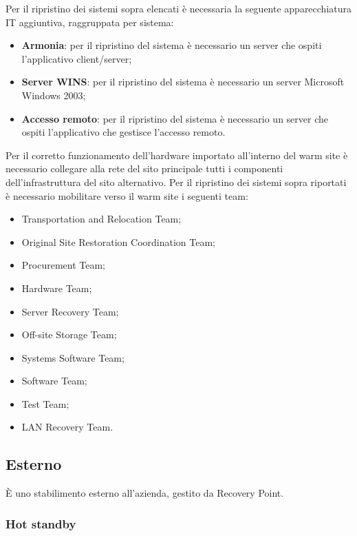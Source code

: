 \documentclass[12pt, a4paper, titlepage]{report}
\newcommand{\hotVendor}{Recovery Point} %
\begin{document}
	Per il ripristino dei sistemi sopra elencati è necessaria la seguente apparecchiatura IT aggiuntiva, raggruppata per sistema:
	\begin{itemize}
		\item \textbf{Armonia}: per il ripristino del sistema è necessario un server che ospiti l'applicativo client/server;
		\item \textbf{Server WINS}: per il ripristino del sistema è necessario un server Microsoft Windows 2003;
		\item \textbf{Accesso remoto}: per il ripristino del sistema è necessario un server che ospiti l'applicativo che gestisce l'accesso remoto.
	\end{itemize}
	Per il corretto funzionamento dell'hardware importato all'interno del warm site è necessario collegare alla rete del sito principale tutti i componenti dell'infrastruttura del sito alternativo.
	Per il ripristino dei sistemi sopra riportati è necessario mobilitare verso il warm site i seguenti team:
	\begin{itemize}
		\item Transportation and Relocation Team;
		\item Original Site Restoration Coordination Team;
		\item Procurement Team;
		\item Hardware Team;
		\item Server Recovery Team;
		\item Off-site Storage Team;
		\item Systems Software Team;
		\item Software Team;
		\item Test Team;
		\item LAN Recovery Team.
	\end{itemize}
	
	\subsection{Esterno} \label{esterno}
	
	È uno stabilimento esterno all'azienda, gestito da \hotVendor.
	
	\subsubsection{Hot standby} \label{hot}
	
\end{document}

